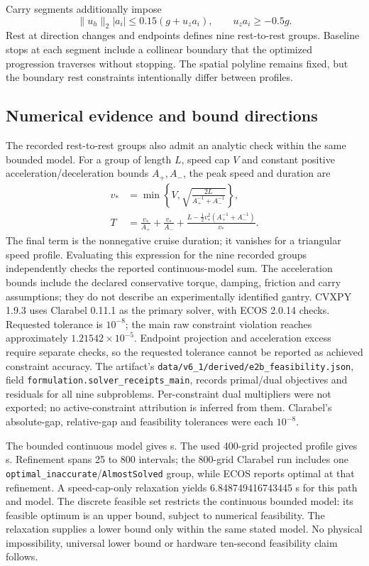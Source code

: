 Carry segments additionally impose
\begin{equation}
 \|u_h\|_2|a_i|\le0.15(g+u_z a_i),\qquad u_z a_i\ge-0.5g.
\end{equation}
Rest at direction changes and endpoints defines nine rest-to-rest groups. Baseline stops at each segment include a collinear boundary that the optimized progression traverses without stopping. The spatial polyline remains fixed, but the boundary rest constraints intentionally differ between profiles.

\subsection{Numerical evidence and bound directions}
The recorded rest-to-rest groups also admit an analytic check within the same bounded model. For a group of length $L$, speed cap $V$ and constant positive acceleration/deceleration bounds $A_+,A_-$, the peak speed and duration are
\begin{align}
 v_*&=\min\left\{V,\sqrt{\frac{2L}{A_+^{-1}+A_-^{-1}}}\right\},\\
 T&=\frac{v_*}{A_+}+\frac{v_*}{A_-}
   +\frac{L-\tfrac12v_*^2(A_+^{-1}+A_-^{-1})}{v_*}.
\end{align}
The final term is the nonnegative cruise duration; it vanishes for a triangular speed profile. Evaluating this expression for the nine recorded groups independently checks the reported continuous-model sum. The acceleration bounds include the declared conservative torque, damping, friction and carry assumptions; they do not describe an experimentally identified gantry.
CVXPY 1.9.3 uses Clarabel 0.11.1 as the primary solver, with ECOS 2.0.14 checks. Requested tolerance is $10^{-8}$; the main raw constraint violation reaches approximately $1.21542\times10^{-5}$. Endpoint projection and acceleration excess require separate checks, so the requested tolerance cannot be reported as achieved constraint accuracy.
The artifact's \texttt{data/v6\_1/derived/e2b\_feasibility.json}, field \texttt{formulation.solver\_receipts\_main}, records primal/dual objectives and residuals for all nine subproblems. Per-constraint dual multipliers were not exported; no active-constraint attribution is inferred from them. Clarabel's absolute-gap, relative-gap and feasibility tolerances were each $10^{-8}$.

The bounded continuous model gives \GantryContinuous{} s. The used 400-grid projected profile gives \GantryOptimisedPrecise{} s. Refinement spans 25 to 800 intervals; the 800-grid Clarabel run includes one \texttt{optimal\_inaccurate}/\texttt{AlmostSolved} group, while ECOS reports optimal at that refinement. A speed-cap-only relaxation yields 6.848749416743445 s for this path and model. The discrete feasible set restricts the continuous bounded model: its feasible optimum is an upper bound, subject to numerical feasibility. The relaxation supplies a lower bound only within the same stated model. No physical impossibility, universal lower bound or hardware ten-second feasibility claim follows.

